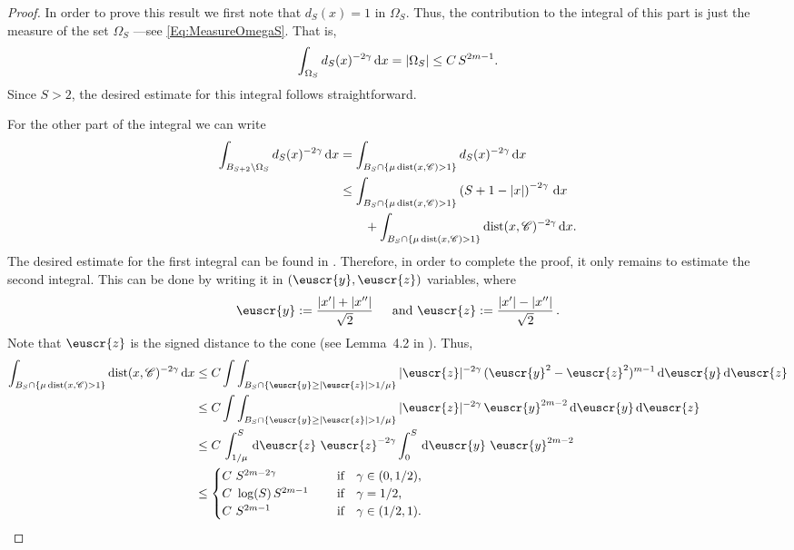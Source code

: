 \begin{proof}
In order to prove this result we first note that $d_S(x)=1$ in $\Omega_S$. Thus, the contribution to the integral of this part is just the measure of the set $\Omega_S$ ---see \eqref{Eq:MeasureOmegaS}. That is,
$$
\int_{\Omega_S} d_S(x)^{-2\gamma} \,\mathrm{d} x = |\Omega_S| \leq C\,S^{2m-1}.
$$
Since $S>2$, the desired estimate for this integral follows straightforward.

For the other part of the integral we can write
\begin{align*}
\int_{B_{S+2}\setminus \Omega_S} d_S(x)^{-2\gamma} \,\mathrm{d} x &= \int_{B_{S}\cap \{\mu \operatorname{dist}(x,\mathscr{C})>1\}} d_S(x)^{-2\gamma} \,\mathrm{d} x \\
& \leq \int_{B_{S}\cap \{\mu \operatorname{dist}(x,\mathscr{C})>1\}} \left( S+1-|x| \right)^{-2\gamma} \,\mathrm{d} x \\
& \quad \quad + \int_{B_{S}\cap \{\mu \operatorname{dist}(x,\mathscr{C})>1\}} \operatorname{dist}(x,\mathscr{C})^{-2\gamma} \,\mathrm{d} x.
\end{align*}
The desired estimate for the first integral can be found in \cite{SavinValdinoci-EnergyEstimate}. Therefore, in order to complete the proof, it only remains to estimate the second integral. This can be done by writing it in $(\euscr{y},\euscr{z})$ variables, where
$$
\euscr{y} := \dfrac{|x'|+|x''|}{\sqrt{2}} \, \quad \text{ and } \euscr{z} := \dfrac{|x'|-|x''|}{\sqrt{2}}\,.
$$
Note that $\euscr{z}$ is the signed distance to the cone (see Lemma~4.2 in \cite{CabreTerraI}). Thus,
\begin{align*}
\int_{B_{S}\cap \{\mu \dist(x,\ccal)>1\}} \dist(x,\ccal)^{-2\s} \d x &\leq C \int \int_{B_{S}\cap \{\euscr{y}\geq|\euscr{z}|>1/\mu\}} |\euscr{z}|^{-2\s} \, (\euscr{y}^2-\euscr{z}^2)^{m-1} \d \euscr{y}\d \euscr{z} \\
& \leq C \int \int_{B_{S}\cap \{\euscr{y}\geq|\euscr{z}|>1/\mu\}} |\euscr{z}|^{-2\s} \, \euscr{y}^{2m-2} \d \euscr{y}\d \euscr{z} \\
& \leq C\, \int_{1/\mu}^S \d \euscr{z}   \ \euscr{z}^{-2\s}\int_0^S \d \euscr{y}\  \euscr{y}^{2m-2} \\
& \leq \begin{cases}
C \ S^{2m-2\s}\ \ \ \ &\textrm{if } \ \ \s\in(0,1/2),\\
C\ \log(S)\,S^{2m-1}\ \ \ \ &\textrm{if } \ \ \s=1/2,\\
C \ S^{2m-1}\ \ \ \ &\textrm{if } \ \ \s\in(1/2,1).\\
\end{cases}
\end{align*}
\end{proof}

